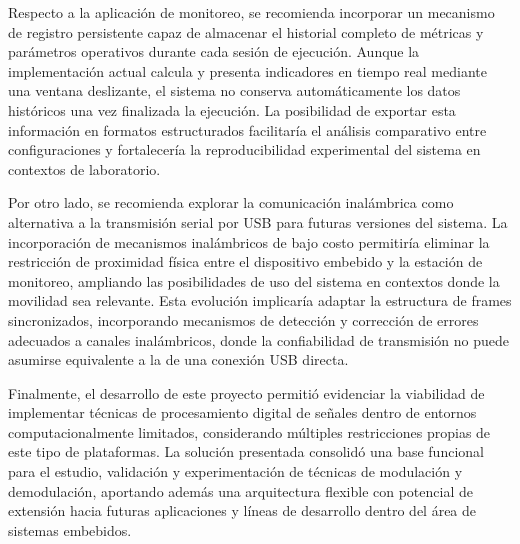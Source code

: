 Respecto a la aplicación de monitoreo, se recomienda incorporar un mecanismo de registro persistente capaz de almacenar el historial completo de métricas y parámetros operativos durante cada sesión de ejecución. Aunque la implementación actual calcula y presenta indicadores en tiempo real mediante una ventana deslizante, el sistema no conserva automáticamente los datos históricos una vez finalizada la ejecución. La posibilidad de exportar esta información en formatos estructurados facilitaría el análisis comparativo entre configuraciones y fortalecería la reproducibilidad experimental del sistema en contextos de laboratorio.

Por otro lado, se recomienda explorar la comunicación inalámbrica como alternativa a la transmisión serial por USB para futuras versiones del sistema. La incorporación de mecanismos inalámbricos de bajo costo permitiría eliminar la restricción de proximidad física entre el dispositivo embebido y la estación de monitoreo, ampliando las posibilidades de uso del sistema en contextos donde la movilidad sea relevante. Esta evolución implicaría adaptar la estructura de frames sincronizados, incorporando mecanismos de detección y corrección de errores adecuados a canales inalámbricos, donde la confiabilidad de transmisión no puede asumirse equivalente a la de una conexión USB directa.

Finalmente, el desarrollo de este proyecto permitió evidenciar la viabilidad de implementar técnicas de procesamiento digital de señales dentro de entornos computacionalmente limitados, considerando múltiples restricciones propias de este tipo de plataformas. La solución presentada consolidó una base funcional para el estudio, validación y experimentación de técnicas de modulación y demodulación, aportando además una arquitectura flexible con potencial de extensión hacia futuras aplicaciones y líneas de desarrollo dentro del área de sistemas embebidos.